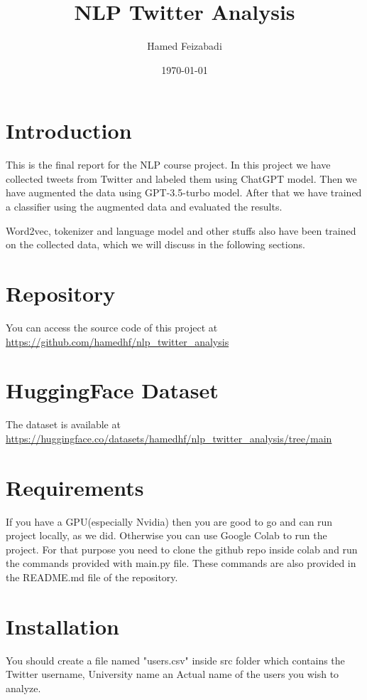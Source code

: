 \documentclass[12pt, letterpaper]{article}
\title{NLP Twitter Analysis}
\author{Hamed Feizabadi}
\date{\today}
\begin{document}
    \maketitle
    \tableofcontents
    \newpage


    \section{Introduction}\label{sec:introduction}
    This is the final report for the NLP course project. In this project we have collected tweets from Twitter and labeled them using ChatGPT model. Then we have augmented the data using GPT-3.5-turbo model. After that we have trained a classifier using the augmented data and evaluated the results.

    Word2vec, tokenizer and language model and other stuffs also have been trained on the collected data, which we will discuss in the following sections.


    \section{Repository}\label{sec:repository}
    You can access the source code of this project at \url{https://github.com/hamedhf/nlp_twitter_analysis}

    \section{HuggingFace Dataset}\label{sec:huggingface-dataset}
    The dataset is available at \url{https://huggingface.co/datasets/hamedhf/nlp_twitter_analysis/tree/main}

    \section{Requirements}\label{sec:requirements}
    If you have a GPU(especially Nvidia) then you are good to go and can run project locally, as we did. Otherwise you can use Google Colab to run the project. For that purpose you need to clone the github repo inside colab and run the commands provided with main.py file. These commands are also provided in the README.md file of the repository.

    \section{Installation}\label{sec:installation}
    You should create a file named "users.csv" inside src folder which contains the Twitter username, University name an Actual name of the users you wish to analyze.
\end{document}
